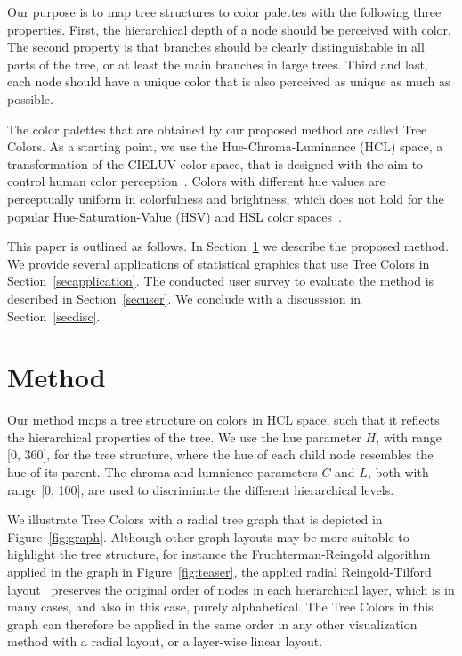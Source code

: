 \documentclass[journal]{vgtc}                %
\begin{document}
Our purpose is to map tree structures to color palettes with the following three properties. First, the hierarchical depth of a node should be perceived with color. The second property is that branches should be clearly distinguishable in all parts of the tree, or at least the main branches in large trees. Third and last, each node should have a unique color that is also perceived as unique as much as possible.

The color palettes that are obtained by our proposed method are called Tree Colors. As a starting point, we use the Hue-Chroma-Luminance (HCL) space, a transformation of the CIELUV color space, that is designed with the aim to control human color perception~\cite{ihaka2003}. Colors with different hue values are perceptually uniform in colorfulness and brightness, which does not hold for the popular Hue-Saturation-Value (HSV) and HSL color spaces~\cite{zeileis2009}.

This paper is outlined as follows. In Section~\ref{secmethod} we describe the proposed method. We provide several applications of statistical graphics that use Tree Colors in Section~\ref{secapplication}. The conducted user survey to evaluate the method is described in Section~\ref{secuser}. We conclude with a discusssion in Section~\ref{secdisc}.

\section{Method}\label{secmethod}
Our method maps a tree structure on colors in HCL space, such that it reflects the hierarchical properties of the tree. We use the hue parameter $H$, with range [0, 360], for the tree structure, where the hue of each child node resembles the hue of its parent. The chroma and lumnience parameters $C$ and $L$, both with range [0, 100], are used to discriminate the different hierarchical levels.

We illustrate Tree Colors with a radial tree graph that is depicted in Figure~\ref{fig:graph}. Although other graph layouts may be more suitable to highlight the tree structure, for instance the Fruchterman-Reingold algorithm~\cite{Fruchterman91} applied in the graph in Figure~\ref{fig:teaser}, the applied radial Reingold-Tilford layout~\cite{reingold81} preserves the original order of nodes in each hierarchical layer, which is in many cases, and also in this case, purely alphabetical. The Tree Colors in this graph can therefore be applied in the same order in any other visualization method with a radial layout, or a  layer-wise linear layout. %
\end{document}
